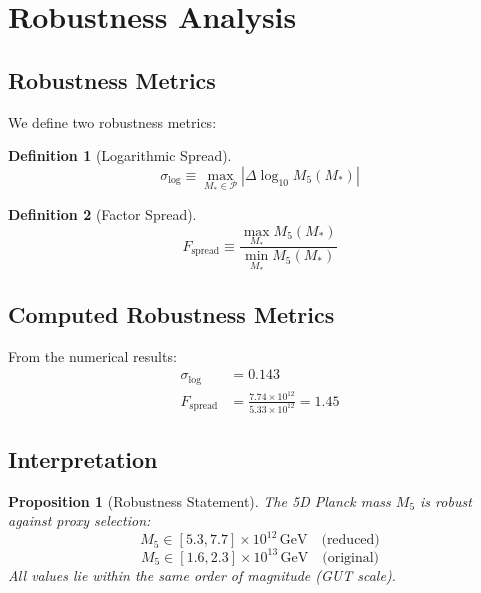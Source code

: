 \documentclass[11pt,a4paper]{article}
\newcommand{\Mfive}{M_5}
\newcommand{\Mstar}{M_*}
\newcommand{\GeV}{\,\mathrm{GeV}}
\theoremstyle{definition}
\newtheorem{definition}{Definition}[section]
\theoremstyle{plain}
\newtheorem{proposition}{Proposition}[section]
\theoremstyle{remark}
\begin{document}
\section{Robustness Analysis}
\label{sec:robustness}

\subsection{Robustness Metrics}

We define two robustness metrics:

\begin{definition}[Logarithmic Spread]
\begin{equation}
\sigma_{\log} \equiv \max_{\Mstar \in \mathcal{P}} |\Delta\log_{10}\Mfive(\Mstar)|
\label{eq:sigma-log-def}
\end{equation}
\end{definition}

\begin{definition}[Factor Spread]
\begin{equation}
F_{\mathrm{spread}} \equiv \frac{\max_{\Mstar}\Mfive(\Mstar)}{\min_{\Mstar}\Mfive(\Mstar)}
\label{eq:F-spread-def}
\end{equation}
\end{definition}

\subsection{Computed Robustness Metrics}

From the numerical results:
\begin{align}
\sigma_{\log} &= 0.143 \label{eq:sigma-log-value} \\
F_{\mathrm{spread}} &= \frac{7.74 \times 10^{12}}{5.33 \times 10^{12}} = 1.45 \label{eq:F-spread-value}
\end{align}

\subsection{Interpretation}

\begin{proposition}[Robustness Statement]
The 5D Planck mass $\Mfive$ is robust against proxy selection:
\begin{equation}
\Mfive \in [5.3, 7.7] \times 10^{12}\GeV \quad \text{(reduced)}
\label{eq:M5-range-red}
\end{equation}
\begin{equation}
\Mfive \in [1.6, 2.3] \times 10^{13}\GeV \quad \text{(original)}
\label{eq:M5-range-orig}
\end{equation}
All values lie within the same order of magnitude (GUT scale).
\end{proposition}
\end{document}
